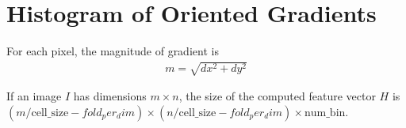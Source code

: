 \section{Histogram of Oriented Gradients}
For each pixel, the magnitude of gradient is 
\begin{align*}
m = \sqrt{dx^2 + dy^2}
\end{align*}

If an image $I$ has dimensions $m\times n$, the size of the computed feature
vector $H$ is $(m/\text{cell\_size} - fold_per_dim) \times (n/\text{cell\_size}
- fold_per_dim) \times \text{num\_bin}$.

\begin{figure}[h]
  \centering
  \subfigure[Depth HOG] {
    \includegraphics[trim={0cm 1.5cm 0cm 0cm},
}
\end{figure}
